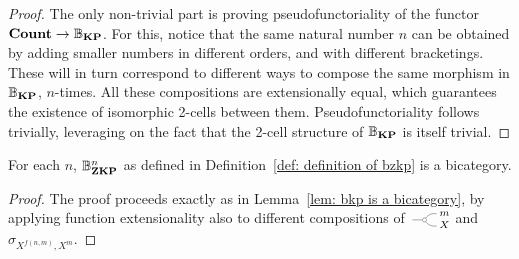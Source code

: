 \addtocounter{theoremUnified}{-1}
\endgroup
\begin{proof}
  The only non-trivial part is proving pseudofunctoriality 
  of the functor $\textbf{Count} \to \mathbb{B}_\textbf{KP}$. For this, notice that 
  the same natural number $n$ can be obtained by 
  adding smaller numbers in different orders, and with 
  different bracketings. These will in turn correspond to 
  different ways to compose the same morphism in $\mathbb{B}_\textbf{KP}$,
  $n$-times. All these compositions are extensionally equal, 
  which guarantees the existence of isomorphic 2-cells between 
  them. Pseudofunctoriality follows trivially, leveraging on the 
  fact that the 2-cell structure of $\mathbb{B}_\textbf{KP}$ is itself trivial.
\end{proof}
%
%
\begin{lemma}
  For each $n$, $\mathbb{B}^{n}_\textbf{ZKP}$ as defined in Definition~\ref{def: definition of bzkp} is a bicategory.
\end{lemma}
\begin{proof}
  The proof proceeds exactly as in Lemma~\ref{lem: bkp is a bicategory}, 
  by applying function extensionality also to different 
  compositions of $\COPYSym_X^m$  and $\sigma_{X^{f(n,m)},X^m}$.
\end{proof}
%
%
\begingroup
\def\thetheoremUnified{\ref{thm: the cube}}
